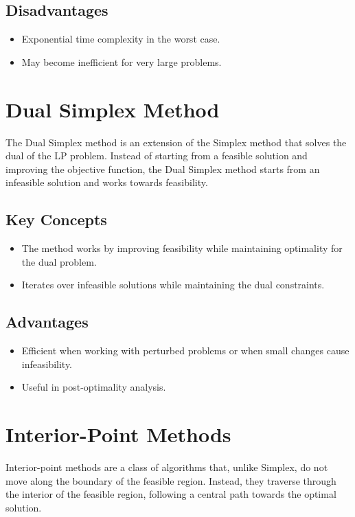 \documentclass{article}
\begin{document}
\subsection{Disadvantages}
\begin{itemize}
    \item Exponential time complexity in the worst case.
    \item May become inefficient for very large problems.
\end{itemize}

\section{Dual Simplex Method}
The Dual Simplex method is an extension of the Simplex method that solves the dual of the LP problem. Instead of starting from a feasible solution and improving the objective function, the Dual Simplex method starts from an infeasible solution and works towards feasibility.

\subsection{Key Concepts}
\begin{itemize}
    \item The method works by improving feasibility while maintaining optimality for the dual problem.
    \item Iterates over infeasible solutions while maintaining the dual constraints.
\end{itemize}

\subsection{Advantages}
\begin{itemize}
    \item Efficient when working with perturbed problems or when small changes cause infeasibility.
    \item Useful in post-optimality analysis.
\end{itemize}

\section{Interior-Point Methods}
Interior-point methods are a class of algorithms that, unlike Simplex, do not move along the boundary of the feasible region. Instead, they traverse through the interior of the feasible region, following a central path towards the optimal solution.
\end{document}
